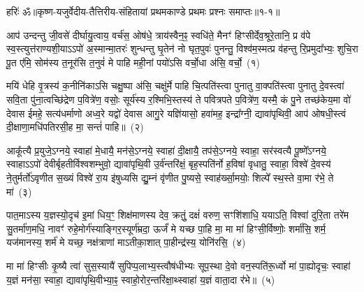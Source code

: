 {\anuvakamend[{जु॒षेथा॒मा स नो॑ यजा॒दा त्रयो॑विꣳशतिश्च}]}

{हरिः॑ ॐ}{॥कृष्ण-यजुर्वेदीय-तैत्तिरीय-संहितायां प्रथमकाण्डे प्रथमः प्रश्नः समाप्तः॥१-१॥}

\setcounter{anuvakam}{0}
आप॑ उन्दन्तु जी॒वसे॑ दीर्घायु॒त्वाय॒ वर्च॑स॒ ओष॑धे॒ त्राय॑स्वैन॒ꣴ॒ स्वधि॑ते॒ मैनꣳ॑ हिꣳसीर्देव॒श्रूरे॒तानि॒ प्र व॑पे स्व॒स्त्युत्त॑राण्यशी॒या\-ऽऽ\-पो॑ अ॒स्मान्मा॒तरः॑ शुन्धन्तु घृ॒तेन॑ नो घृत॒पुवः॑ पुनन्तु॒ विश्व॑म॒स्मत्प्र व॑हन्तु रि॒प्रमुदा᳚भ्यः॒ शुचि॒रा पू॒त ए॑मि॒ सोम॑स्य त॒नूर॑सि त॒नुवं॑ मे पाहि मही॒नां पयो॑\-ऽसि वर्चो॒धा अ॑सि॒ वर्चो॒~(१)

मयि॑ धेहि वृ॒त्रस्य॑ क॒नीनि॑का\-ऽसि चक्षु॒ष्पा अ॑सि॒ चक्षु॑र्मे पाहि चि॒त्पति॑स्त्वा पुनातु वा॒क्पति॑स्त्वा पुनातु दे॒वस्त्वा॑ सवि॒ता पु॑ना॒त्वच्छि॑द्रेण प॒वित्रे॑ण॒ वसोः॒ सूर्य॑स्य र॒श्मिभि॒स्तस्य॑ ते पवित्रपते प॒वित्रे॑ण॒ यस्मै॒ कं पु॒ने तच्छ॑केय॒मा वो॑ देवास ईमहे॒ सत्य॑धर्माणो अध्व॒रे यद्वो॑ देवास आगु॒रे यज्ञि॑यासो॒ हवा॑मह॒ इन्द्रा᳚ग्नी॒ द्यावा॑पृथिवी॒ आप॑ ओषधी॒स्त्वं दी॒क्षाणा॒मधि॑\-पतिरसी॒ह मा॒ सन्तं॑ पाहि॥~(२)

{\anuvakamend[{वर्च॑ ओषधीर॒ष्टौ च॑}]}%

आकू᳚त्यै प्र॒युजे॒\-ऽग्नये॒ स्वाहा॑ मे॒धायै॒ मन॑से॒\-ऽग्नये॒ स्वाहा॑ दी॒क्षायै॒ तप॑से॒\-ऽग्नये॒ स्वाहा॒ सर॑स्वत्यै पू॒ष्णे᳚\-ऽग्नये॒ स्वाहा\-ऽऽ\-पो॑ देवीर्बृहतीर्विश्वशम्भुवो॒ द्यावा॑\-पृथि॒वी उ॒र्व॑न्तरि॑क्षं॒ बृह॒स्पति॑र्नो ह॒विषा॑ वृधातु॒ स्वाहा॒ विश्वे॑ दे॒वस्य॑ ने॒तुर्मर्तो॑\-ऽवृणीत स॒ख्यं विश्वे॑ रा॒य इ॑षुध्यसि द्यु॒म्नं वृ॑णीत पु॒ष्यसे॒ स्वाह॑र्ख्सा॒मयोः॒ शिल्पे᳚ स्थ॒स्ते वा॒मा र॑भे॒ ते मा॑~(३)

पात॒मा\-ऽस्य य॒ज्ञस्यो॒दृच॑ इ॒मां धिय॒ꣳ॒ शिक्ष॑माणस्य देव॒ क्रतुं॒ दक्षं॑ वरुण॒ सꣳशि॑शाधि॒ यया\-ऽति॒ विश्वा॑ दुरि॒ता तरे॑म सु॒तर्मा॑ण॒मधि॒ नावꣳ॑ रुहे॒मोर्ग॑स्याङ्गिर॒स्यूर्ण॑म्रदा॒ ऊर्जं॑ मे यच्छ पा॒हि मा॒ मा मा॑ हिꣳसी॒र्विष्णोः॒ शर्मा॑सि॒ शर्म॒ यज॑मानस्य॒ शर्म॑ मे यच्छ॒ नक्ष॑त्राणां मा\-ऽतीका॒शात् पा॒हीन्द्र॑स्य॒ योनि॑रसि॒~(४)

मा मा॑ हिꣳसीः कृ॒ष्यै त्वा॑ सुस॒स्यायै॑ सुपिप्प॒लाभ्य॒स्त्वौष॑\-धीभ्यः सूप॒स्था दे॒वो वन॒स्पति॑रू॒र्ध्वो मा॑ पा॒ह्योदृचः॒ स्वाहा॑ य॒ज्ञं मन॑सा॒ स्वाहा॒ द्यावा॑\-पृथि॒वीभ्या॒ꣴ॒ स्वाहो॒रोर॒न्तरि॑क्षा॒थ्\-स्वाहा॑ य॒ज्ञं वाता॒दा र॑भे॥~(५)

